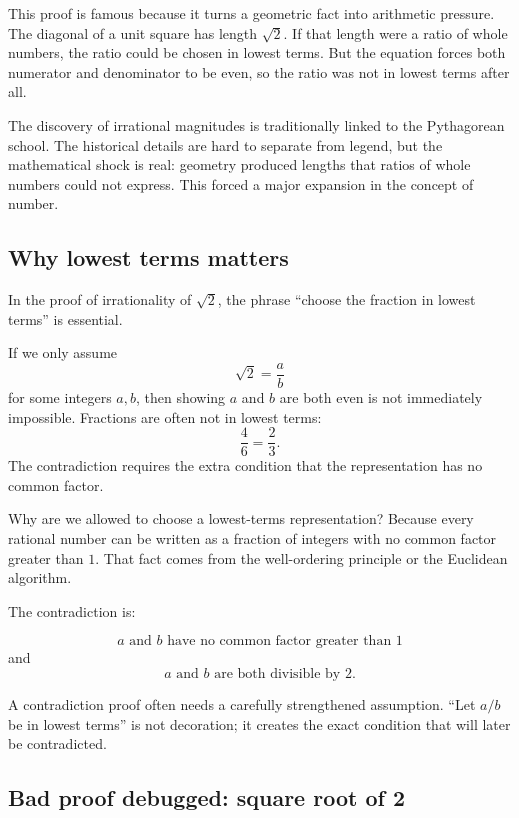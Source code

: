 This proof is famous because it turns a geometric fact into arithmetic pressure. The diagonal of a unit square has length $\sqrt2$. If that length were a ratio of whole numbers, the ratio could be chosen in lowest terms. But the equation forces both numerator and denominator to be even, so the ratio was not in lowest terms after all.

\begin{historybox}
The discovery of irrational magnitudes is traditionally linked to the Pythagorean school. The historical details are hard to separate from legend, but the mathematical shock is real: geometry produced lengths that ratios of whole numbers could not express. This forced a major expansion in the concept of number.
\end{historybox}

\subsection{Why lowest terms matters}

In the proof of irrationality of $\sqrt2$, the phrase ``choose the fraction in lowest terms'' is essential.

If we only assume
\[
\sqrt2=\frac ab
\]
for some integers $a,b$, then showing $a$ and $b$ are both even is not immediately impossible. Fractions are often not in lowest terms:
\[
\frac46=\frac23.
\]
The contradiction requires the extra condition that the representation has no common factor.

Why are we allowed to choose a lowest-terms representation? Because every rational number can be written as a fraction of integers with no common factor greater than $1$. That fact comes from the well-ordering principle or the Euclidean algorithm.

The contradiction is:

\[
\text{$a$ and $b$ have no common factor greater than $1$}
\]
and
\[
\text{$a$ and $b$ are both divisible by $2$}.
\]

\begin{formalbox}
A contradiction proof often needs a carefully strengthened assumption. ``Let $a/b$ be in lowest terms'' is not decoration; it creates the exact condition that will later be contradicted.
\end{formalbox}

\subsection{Bad proof debugged: square root of 2}

